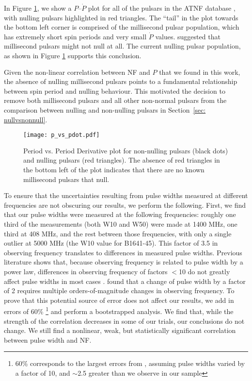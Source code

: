 \documentclass[fleqn,usenatbib]{mnras}
\begin{document}
In Figure \ref{fig:p_vs_pdot}, we show a $P$--$\dot{P}$ plot for all of the pulsars in the ATNF database \citep{Manchester_2005}, with nulling pulsars highlighted in red triangles. The ``tail'' in the plot towards the bottom left corner is comprised of the millisecond pulsar population, which has extremely short spin periods and very small $\dot{P}$ values. \citet{rajwade2016probing} suggested that millisecond pulsars might not null at all. The current nulling pulsar population, as shown in Figure \ref{fig:p_vs_pdot} supports this conclusion. 

Given the non-linear correlation between NF and $P$ that we found in this work, the absence of nulling millisecond pulsars points to a fundamental relationship between spin period and nulling behaviour. This motivated the decision to remove both millisecond pulsars and all other non-normal pulsars from the comparison between nulling and non-nulling pulsars in Section~\ref{sec: nullvsnonnull}.

\begin{figure}
    \centering
    \texttt{[image: p\_vs\_pdot.pdf]}
    \caption{Period vs. Period Derivative plot for non-nulling pulsars (black dots) and nulling pulsars (red triangles). The absence of red triangles in the bottom left of the plot indicates that there are no known millisecond pulsars that null.}
    \label{fig:p_vs_pdot}
\end{figure}

To ensure that the uncertainties resulting from pulse widths measured at different frequencies are not obscuring our results, we perform the following. First, we find that our pulse widths were measured at the following frequencies: roughly one third of the measurements (both W10 and W50) were made at 1400 MHz, one third at 408 MHz, and the rest between those frequencies, with only a single outlier at 5000 MHz (the W10 value for B1641-45). This factor of 3.5 in observing frequency translates to differences in measured pulse widths.  Previous literature shows that, because observing frequency is related to pulse width by a power law, differences in observing frequency of factors $<$10 do not greatly affect pulse widths in most cases \citep[e.g., ][]{DAmico1998parkes,chen2014frequency}. \citet{rankin1983toward2} found that a change of pulse width by a factor of 2 requires multiple orders-of-magnitude changes in observing frequency. To prove that this potential source of error does not affect our results, we add in errors of 60\% \footnote{60\% corresponds to the largest errors from \citet{chen2014frequency}, assuming pulse widths varied by a factor of 10, and $\sim$2.5 greater than we observe in our sample} and perform a bootstrapped analysis. We find that, while the strength of the correlation decreases in some of our trials, our conclusions do not change. We still find a nonlinear, weak, but statistically significant correlation between pulse width and NF.
\end{document}
